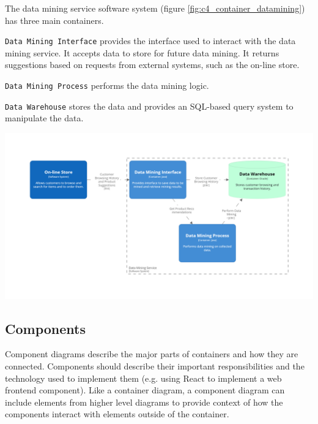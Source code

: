 \filbreak
\noindent
The data mining service software system (figure \ref{fig:c4_container_datamining}) has three main containers.

\texttt{Data Mining Interface} provides the interface used to interact with the data mining service.
It accepts data to store for future data mining.
It returns suggestions based on requests from external systems, such as the on-line store.

\texttt{Data Mining Process} performs the data mining logic.

\texttt{Data Warehouse} stores the data and provides an SQL-based query system to manipulate the data.

\begin{center}
    \begin{adjustwidth}{-5mm}{-5mm}
        \includegraphics[trim=185 185 185 185,clip,width=0.92\paperwidth]{images/c4/datamining_container_diagram.png}
    \end{adjustwidth}
    \label{fig:c4_container_datamining}
\end{center}

\subsection{Components}
Component diagrams describe the major parts of containers and how they are connected.
Components should describe their important responsibilities and the technology used to implement them
(e.g. using React to implement a web frontend component).
Like a container diagram, a component diagram can include elements from higher level diagrams
to provide context of how the components interact with elements outside of the container.

